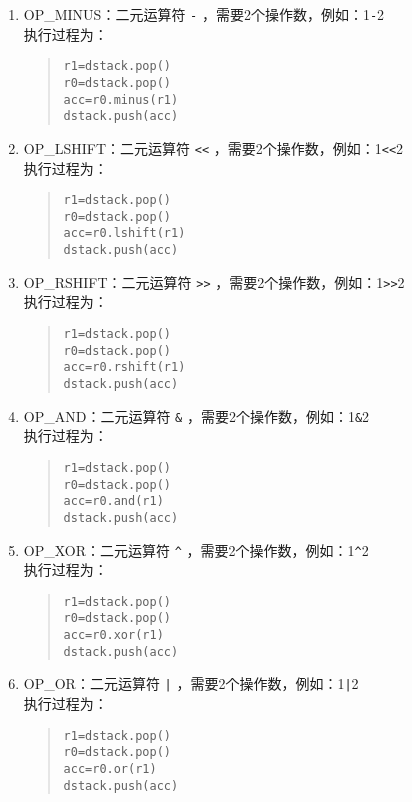 \begin{enumerate}
\item OP\_MINUS：二元运算符 \verb|-| ，需要2个操作数，例如：1\verb|-|2 \\
执行过程为：
\begin{quote}
\begin{verbatim}
r1=dstack.pop()
r0=dstack.pop()
acc=r0.minus(r1)
dstack.push(acc)
\end{verbatim}
\end{quote}

\item OP\_LSHIFT：二元运算符 \verb|<<| ，需要2个操作数，例如：1\verb|<<|2 \\
执行过程为：
\begin{quote}
\begin{verbatim}
r1=dstack.pop()
r0=dstack.pop()
acc=r0.lshift(r1)
dstack.push(acc)
\end{verbatim}
\end{quote}

\item OP\_RSHIFT：二元运算符 \verb|>>| ，需要2个操作数，例如：1\verb|>>|2 \\
执行过程为：
\begin{quote}
\begin{verbatim}
r1=dstack.pop()
r0=dstack.pop()
acc=r0.rshift(r1)
dstack.push(acc)
\end{verbatim}
\end{quote}

\item OP\_AND：二元运算符 \verb|&| ，需要2个操作数，例如：1\verb|&|2 \\
执行过程为：
\begin{quote}
\begin{verbatim}
r1=dstack.pop()
r0=dstack.pop()
acc=r0.and(r1)
dstack.push(acc)
\end{verbatim}
\end{quote}

\item OP\_XOR：二元运算符 \verb|^| ，需要2个操作数，例如：1\verb|^|2 \\
执行过程为：
\begin{quote}
\begin{verbatim}
r1=dstack.pop()
r0=dstack.pop()
acc=r0.xor(r1)
dstack.push(acc)
\end{verbatim}
\end{quote}

\item OP\_OR：二元运算符 \verb^|^ ，需要2个操作数，例如：1\verb^|^2 \\
执行过程为：
\begin{quote}
\begin{verbatim}
r1=dstack.pop()
r0=dstack.pop()
acc=r0.or(r1)
dstack.push(acc)
\end{verbatim}
\end{quote}


\end{enumerate}
